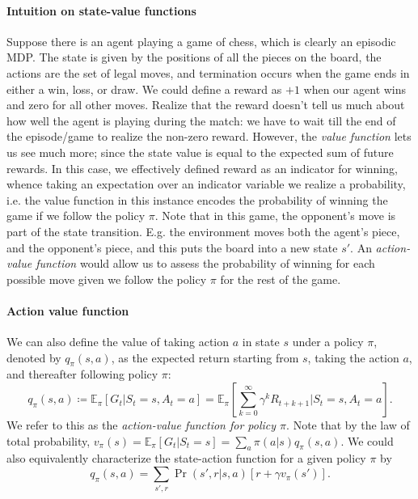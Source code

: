 \documentclass[12pt]{article}
\begin{document}
\paragraph{Intuition on state-value functions} Suppose there is an agent playing a game of chess, which is clearly an episodic MDP. The state is given by the positions of all the pieces on the board, the actions are the set of legal moves, and termination occurs when the game ends in either a win, loss, or draw. We could define a reward as $+1$ when our agent wins and zero for all other moves. Realize that the reward doesn't tell us much about how well the agent is playing during the match: we have to wait till the end of the episode/game to realize the non-zero reward. However, the \emph{value function} lets us see much more; since the state value is equal to the expected sum of future rewards. In this case, we effectively defined reward as an indicator for winning, whence taking an expectation over an indicator variable we realize a probability, i.e. the value function in this instance encodes the probability of winning the game if we follow the policy $\pi$. Note that in this game, the opponent's move is part of the state transition. E.g. the environment moves both the agent's piece, and the opponent's piece, and this puts the board into a new state $s'$. An \emph{action-value function} would allow us to assess the probability of winning for each possible move given we follow the policy $\pi$ for the rest of the game.

\paragraph{Action value function}
We can also define the value of taking action $a$ in state $s$ under a policy $\pi$, denoted by $q_\pi(s,a)$, as the expected return starting from $s$, taking the action $a$, and thereafter following policy $\pi$:
\begin{equation}
  \label{eq: actionvaluepolicyforpi}
  q_\pi(s,a) \coloneqq \mathbb E_\pi \left[G_t | S_t = s, A_t = a \right] = \mathbb E_\pi \left[ \sum_{k=0}^\infty \gamma^k R_{t+k+1} | S_t = s , A_t = a \right].
\end{equation}
We refer to this as the \emph{action-value function for policy $\pi$}. Note that by the law of total probability, $v_\pi(s) = \mathbb E_\pi \left[G_t | S_t =       s\right] = \sum_{a} \pi(a|s) q_\pi(s,a)$.
We could also equivalently characterize the state-action function for a given policy $\pi$ by
\[
  q_\pi(s,a) = \sum_{s',r} \Pr(s', r | s, a) \left[ r + \gamma v_\pi (s') \right].
\]
\end{document}
